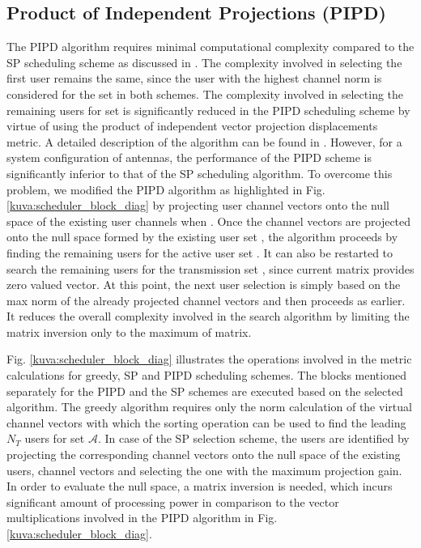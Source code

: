 \documentclass[conference,letterpaper]{./../../IEEE/IEEEtran}
\begin{document}
\subsection{Product of Independent Projections (PIPD)}
The PIPD algorithm requires minimal computational complexity compared to the SP scheduling scheme as discussed in \cite{venkatraman2014low}. The complexity involved in selecting the first user remains the same, since the user with the highest channel norm is considered for the set  in both schemes. The complexity involved in selecting the remaining users for set  is significantly reduced in the PIPD scheduling scheme by virtue of using the product of independent vector projection displacements metric. A detailed description of the algorithm can be found in \cite{venkatraman2014low}. However, for a system configuration of  antennas, the performance of the PIPD scheme is significantly inferior to that of the SP scheduling algorithm. To overcome this problem, we modified the PIPD algorithm as highlighted in Fig. \ref{kuva:scheduler_block_diag} by projecting user channel vectors onto the null space of the existing user channels when . Once the channel vectors are projected onto the null space formed by the existing user set , the algorithm proceeds by finding the remaining users for the active user set . It can also be restarted to search the remaining  users for the transmission set , since current  matrix provides zero valued vector. At this point, the next user selection is simply based on the max norm of the already projected channel vectors and then proceeds as earlier. It reduces the overall complexity involved in the search algorithm by limiting the matrix inversion only to the maximum of  matrix.

Fig. \ref{kuva:scheduler_block_diag} illustrates the operations involved in the metric calculations for greedy, SP and PIPD scheduling schemes. The blocks mentioned separately for the PIPD and the SP schemes are executed based on the selected algorithm. The greedy algorithm requires only the norm calculation of the virtual channel vectors with which the sorting operation can be used to find the leading $N_T$ users for set $\mathcal{A}$. In case of the SP selection scheme, the users are identified by projecting the corresponding channel vectors onto the null space of the existing users, channel vectors and selecting the one with the maximum projection gain. In order to evaluate the null space, a matrix inversion is needed, which incurs significant amount of processing power in comparison to the vector multiplications involved in the PIPD algorithm in Fig. \ref{kuva:scheduler_block_diag}.
\end{document}
